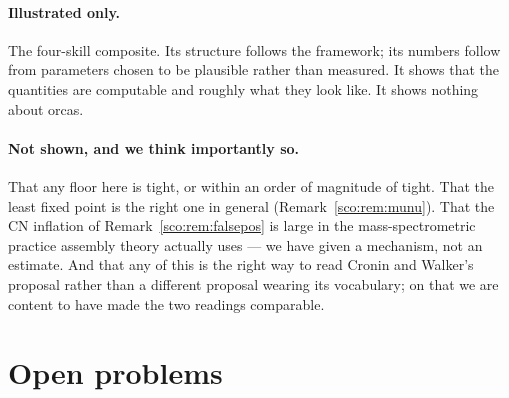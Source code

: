 \documentclass[11pt]{article}
\theoremstyle{plain}
\theoremstyle{definition}
\theoremstyle{remark}
\newcommand{\CN}{\mathrm{CN}}
\begin{document}
\paragraph{Illustrated only.}
The four-skill composite. Its structure follows the framework; its numbers
follow from parameters chosen to be plausible rather than measured. It
shows that the quantities are computable and roughly what they look like.
It shows nothing about orcas.

\paragraph{Not shown, and we think importantly so.}
That any floor here is tight, or within an order of magnitude of tight.
That the least fixed point is the right one in general
(Remark~\ref{sco:rem:munu}). That the $\CN$ inflation of
Remark~\ref{sco:rem:falsepos} is large in the mass-spectrometric practice
assembly theory actually uses --- we have given a mechanism, not an
estimate. And that any of this is the right way to read Cronin and
Walker's proposal rather than a different proposal wearing its
vocabulary; on that we are content to have made the two readings
comparable.

\section{Open problems}\label{sco:S9}
\end{document}
